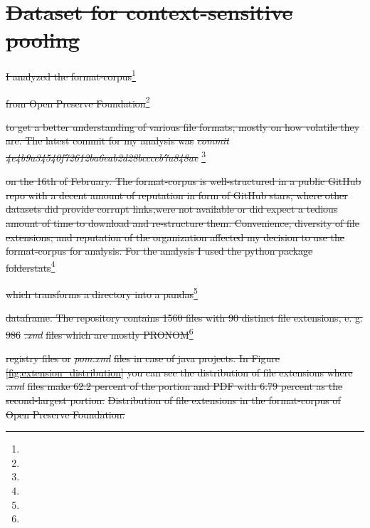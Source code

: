 \documentclass[final]{vutinfth}
\providecommand{\DIFdeltex}[1]{{\protect\color{red}\sout{#1}}}                      %
\providecommand{\DIFdelbegin}{} %
\providecommand{\DIFdelFL}[1]{\DIFdel{#1}} %
\providecommand{\DIFdel}[1]{\texorpdfstring{\DIFdeltex{#1}}{}} %
\begin{document}
\DIFdelbegin \section{\DIFdel{Dataset for context-sensitive pooling}}%
\addtocounter{section}{-1}%
\DIFdel{I analyzed the format-corpus}\footnote{%
} %
\addtocounter{footnote}{-1}%
\DIFdel{from Open Preserve Foundation}\footnote{%
} %
\addtocounter{footnote}{-1}%
\DIFdel{to get a better understanding of various file formats, mostly on how volatile they are. The latest commit for my analysis was }\textit{\DIFdel{commit 4e4b9a34540f72612ba6eab2d28bccceb7a848ae}}%
\footnote{%
} %
\addtocounter{footnote}{-1}%
\DIFdel{on the 16th of February. The format-corpus is well-structured in a public GitHub repo with a decent amount of reputation in form of GitHub stars, where other datasets did provide corrupt links;were not available or did expect a tedious amount of time to download and re-structure them.
Convenience; diversity of file extensions; and reputation of the organization affected my decision to use the format-corpus for analysis. For the analysis I used the python package folderstats}\footnote{%
} %
\addtocounter{footnote}{-1}%
\DIFdel{which transforms a directory into a pandas}\footnote{%
} %
\addtocounter{footnote}{-1}%
\DIFdel{dataframe. The repository contains 1560 files with 90 distinct file extensions, e. g. 986 }\textit{\DIFdel{.xml}} %
\DIFdel{files which are mostly PRONOM}\footnote{%
} %
\addtocounter{footnote}{-1}%
\DIFdel{registry files or }\textit{\DIFdel{pom.xml}} %
\DIFdel{files in case of java projects. In Figure \ref{fig:extension_distribution} you can see the distribution of file extensions where }\textit{\DIFdel{.xml}} %
\DIFdel{files make 62.2 percent of the portion and PDF with 6.79 percent as the second-largest portion.
}%
{%
\DIFdelFL{Distribution of file extensions in the format-corpus of Open Preserve Foundation. }%
}
\end{document}
